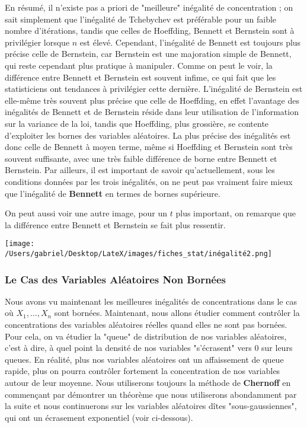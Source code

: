 \documentclass[12pt]{article}
\newcommand{\espace}{\vspace{1.5em}}
\newcommand{\petitespace}{\vspace{0.5cm}}
\newcommand{\Xunan}{X_1,\ldots,X_n} %
\newcommand{\1}{\bb{1}} %
\begin{document}
En résumé, il n'existe pas a priori de "meilleure" inégalité de concentration ; on sait simplement que l'inégalité de Tchebychev est préférable pour un faible nombre d'itérations, tandis que celles de Hoeffding, Bennett et Bernstein sont à privilégier lorsque 
$n$ est élevé. Cependant, l'inégalité de Bennett est toujours plus précise celle de Bernstein, car Bernstein est une majoration simple de Bennett, qui reste cependant plus pratique à manipuler. Comme on peut le voir, la différence entre Bennett et Bernstein est souvent infime, ce qui fait que les statisticiens ont tendances à privilégier cette dernière. L'inégalité de Bernstein est elle-même très souvent plus précise que celle de Hoeffding, en effet l'avantage des inégalités de Bennett et de Bernstein réside dans leur utilisation de l'information sur la variance de la loi, tandis que Hoeffding, plus grossière, se contente d'exploiter les bornes des variables aléatoires. La plus précise des inégalités est donc celle de Bennett à moyen terme, même si Hoeffding et Bernstein sont très souvent suffisante, avec une très faible différence de borne entre Bennett et Bernstein. Par ailleurs, il est important de savoir qu'actuellement, sous les conditions données par les trois inégalités, on ne peut pas vraiment faire mieux que l'inégalité de \textbf{Bennett} en termes de bornes supérieure. 

On peut aussi voir une autre image, pour un $t$ plus important, on remarque que la différence entre Bennett et Bernstein se fait plus ressentir. \petitespace

\texttt{[image: /Users/gabriel/Desktop/LateX/images/fiches\_stat/inégalité2.png]} 

\espace

\subsubsection{Le Cas des Variables Aléatoires Non Bornées}

\espace

Nous avons vu maintenant les meilleures inégalités de concentrations dans le cas où $\Xunan$ sont bornées. Maintenant, nous allons étudier comment contrôler la concentrations des variables aléatoires réelles quand elles ne sont pas bornées. Pour cela, on va étudier la "queue" de distribution de nos variables aléatoires, c'est à dire, à quel point la densité de nos variables "s'écrasent" vers 0 sur leurs queues. En réalité, plus nos variables aléatoires ont un affaissement de queue rapide, plus on pourra contrôler fortement la concentration de nos variables autour de leur moyenne. Nous utiliserons toujours la méthode de \textbf{Chernoff} en commençant par démontrer un théorème que nous utiliserons abondamment par la suite et nous continuerons sur les variables aléatoires dîtes "sous-gaussiennes", qui ont un écrasement exponentiel (voir ci-dessous).
\end{document}
